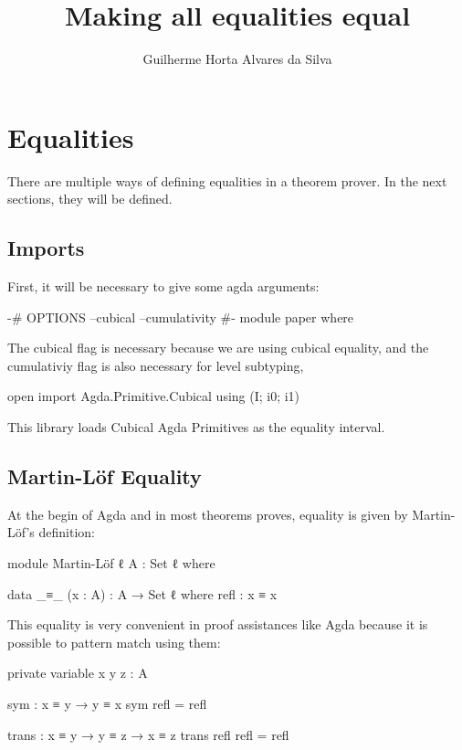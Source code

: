 \documentclass{article}
\author{Guilherme Horta Alvares da Silva}
\title{Making all equalities equal}
\begin{document}
\maketitle

\begin{abstract}

\end{abstract}


\section{Equalities}

There are multiple ways of defining equalities in a theorem prover.
In the next sections, they will be defined.

\subsection{Imports}

First, it will be necessary to give some agda arguments:

\begin{code}
{-# OPTIONS --cubical --cumulativity #-}
module paper where
\end{code}

The cubical flag is necessary because we are using cubical equality,
and the cumulativiy flag is also necessary for level subtyping,

\begin{code}
open import Agda.Primitive.Cubical using (I; i0; i1)
\end{code}

This library loads Cubical Agda Primitives as the equality interval.

\subsection{Martin-Löf Equality}

At the begin of Agda and in most theorems proves, equality is given by Martin-Löf's definition:

\begin{code}
module Martin-Löf {ℓ} {A : Set ℓ} where

  data _≡_ (x : A) : A → Set ℓ where
    refl : x ≡ x
\end{code}

This equality is very convenient in proof assistances like Agda because it is possible to pattern match using them:

\begin{code}
  private variable
    x y z : A

  sym  : x ≡ y → y ≡ x
  sym refl = refl

  trans : x ≡ y → y ≡ z → x ≡ z
  trans refl refl = refl
\end{code}
\end{document}
